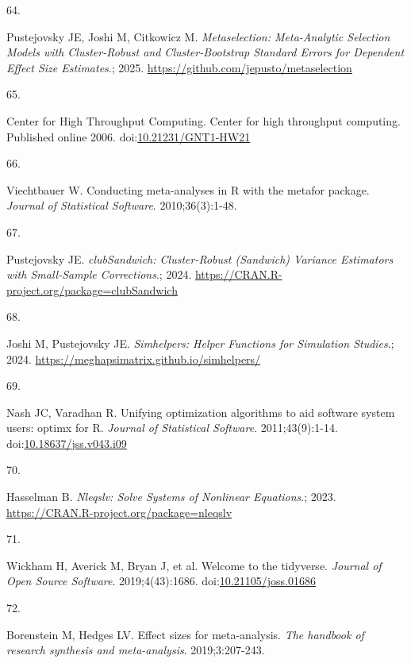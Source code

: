\documentclass[
  american,
  man, donotrepeattitle,floatsintext]{apa7}
\newlength{\cslhangindent}
\newlength{\csllabelwidth}
\newenvironment{CSLReferences}[2] %
 {\begin{list}{}{%
  \setlength{\itemindent}{0pt}
  \setlength{\leftmargin}{0pt}
  \setlength{\parsep}{0pt}
  \ifodd #1
   \setlength{\leftmargin}{\cslhangindent}
   \setlength{\itemindent}{-1\cslhangindent}
  \fi
  \setlength{\itemsep}{#2\baselineskip}}}
 {\end{list}}
\newcommand{\CSLLeftMargin}[1]{\parbox[t]{\csllabelwidth}{\strut#1\strut}}
\newcommand{\CSLRightInline}[1]{\parbox[t]{\linewidth - \csllabelwidth}{\strut#1\strut}}
\begin{document}
\begin{CSLReferences}{0}{1}
\CSLLeftMargin{64. }%
\CSLRightInline{Pustejovsky JE, Joshi M, Citkowicz M. \emph{Metaselection: Meta-Analytic Selection Models with Cluster-Robust and Cluster-Bootstrap Standard Errors for Dependent Effect Size Estimates}.; 2025. \url{https://github.com/jepusto/metaselection}}

\CSLLeftMargin{65. }%
\CSLRightInline{Center for High Throughput Computing. Center for high throughput computing. Published online 2006. doi:\href{https://doi.org/10.21231/GNT1-HW21}{10.21231/GNT1-HW21}}

\CSLLeftMargin{66. }%
\CSLRightInline{Viechtbauer W. {Conducting meta-analyses in R with the metafor package}. \emph{Journal of Statistical Software}. 2010;36(3):1-48.}

\CSLLeftMargin{67. }%
\CSLRightInline{Pustejovsky JE. \emph{clubSandwich: Cluster-Robust (Sandwich) Variance Estimators with Small-Sample Corrections}.; 2024. \url{https://CRAN.R-project.org/package=clubSandwich}}

\CSLLeftMargin{68. }%
\CSLRightInline{Joshi M, Pustejovsky JE. \emph{Simhelpers: Helper Functions for Simulation Studies}.; 2024. \url{https://meghapsimatrix.github.io/simhelpers/}}

\CSLLeftMargin{69. }%
\CSLRightInline{Nash JC, Varadhan R. Unifying optimization algorithms to aid software system users: {optimx} for {R}. \emph{Journal of Statistical Software}. 2011;43(9):1-14. doi:\href{https://doi.org/10.18637/jss.v043.i09}{10.18637/jss.v043.i09}}

\CSLLeftMargin{70. }%
\CSLRightInline{Hasselman B. \emph{Nleqslv: Solve Systems of Nonlinear Equations}.; 2023. \url{https://CRAN.R-project.org/package=nleqslv}}

\CSLLeftMargin{71. }%
\CSLRightInline{Wickham H, Averick M, Bryan J, et al. Welcome to the {tidyverse}. \emph{Journal of Open Source Software}. 2019;4(43):1686. doi:\href{https://doi.org/10.21105/joss.01686}{10.21105/joss.01686}}

\CSLLeftMargin{72. }%
\CSLRightInline{Borenstein M, Hedges LV. Effect sizes for meta-analysis. \emph{The handbook of research synthesis and meta-analysis}. 2019;3:207-243.}


\end{CSLReferences}
\end{document}
